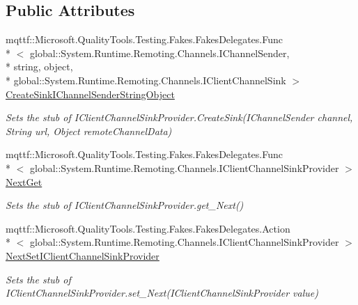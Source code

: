 \subsection*{Public Attributes}
\begin{DoxyCompactItemize}
\item 
mqttf\-::\-Microsoft.\-Quality\-Tools.\-Testing.\-Fakes.\-Fakes\-Delegates.\-Func\\*
$<$ global\-::\-System.\-Runtime.\-Remoting.\-Channels.\-I\-Channel\-Sender, \\*
string, object, \\*
global\-::\-System.\-Runtime.\-Remoting.\-Channels.\-I\-Client\-Channel\-Sink $>$ \hyperlink{class_system_1_1_runtime_1_1_remoting_1_1_channels_1_1_fakes_1_1_stub_i_client_formatter_sink_provider_abe467298e85c36de15e73966dddfd032}{Create\-Sink\-I\-Channel\-Sender\-String\-Object}
\begin{DoxyCompactList}\small\item\em Sets the stub of I\-Client\-Channel\-Sink\-Provider.\-Create\-Sink(\-I\-Channel\-Sender channel, String url, Object remote\-Channel\-Data)\end{DoxyCompactList}\item 
mqttf\-::\-Microsoft.\-Quality\-Tools.\-Testing.\-Fakes.\-Fakes\-Delegates.\-Func\\*
$<$ global\-::\-System.\-Runtime.\-Remoting.\-Channels.\-I\-Client\-Channel\-Sink\-Provider $>$ \hyperlink{class_system_1_1_runtime_1_1_remoting_1_1_channels_1_1_fakes_1_1_stub_i_client_formatter_sink_provider_a541485be01975569ec157b67229a9b9c}{Next\-Get}
\begin{DoxyCompactList}\small\item\em Sets the stub of I\-Client\-Channel\-Sink\-Provider.\-get\-\_\-\-Next()\end{DoxyCompactList}\item 
mqttf\-::\-Microsoft.\-Quality\-Tools.\-Testing.\-Fakes.\-Fakes\-Delegates.\-Action\\*
$<$ global\-::\-System.\-Runtime.\-Remoting.\-Channels.\-I\-Client\-Channel\-Sink\-Provider $>$ \hyperlink{class_system_1_1_runtime_1_1_remoting_1_1_channels_1_1_fakes_1_1_stub_i_client_formatter_sink_provider_a79460c0eb721c5fd1f7ad9e14a8a009f}{Next\-Set\-I\-Client\-Channel\-Sink\-Provider}
\begin{DoxyCompactList}\small\item\em Sets the stub of I\-Client\-Channel\-Sink\-Provider.\-set\-\_\-\-Next(\-I\-Client\-Channel\-Sink\-Provider value)\end{DoxyCompactList}\end{DoxyCompactItemize}


